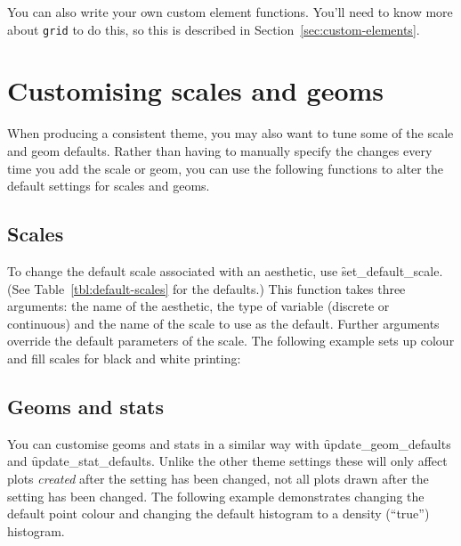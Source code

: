 You can also write your own custom element functions.  You'll need to know more about {\tt grid} to do this, so this is described in Section~\ref{sec:custom-elements}.

\section{Customising scales and geoms}
\label{sec:theme-scale-geom}

When producing a consistent theme, you may also want to tune some of the scale and geom defaults.  Rather than having to manually specify the changes every time you add the scale or geom, you can use the following functions to alter the default settings for scales and geoms.

\subsection{Scales}
\label{sub:customise-scales}

To change the default scale associated with an aesthetic, use \f{set_default_scale}. (See Table~\ref{tbl:default-scales} for the defaults.)  This function takes three arguments: the name of the aesthetic, the type of variable (discrete or continuous) and the name of the scale to use as the default.  Further arguments override the default parameters of the scale.  The following example sets up colour and fill scales for black and white printing:

% 


\subsection{Geoms and stats}
\label{sub:geoms_and_stats}

You can customise geoms and stats in a similar way with \f{update_geom_defaults} and \f{update_stat_defaults}.  Unlike the other theme settings these will only affect plots \emph{created} after the setting has been changed, not all plots drawn after the setting has been changed.  The following example demonstrates changing the default point colour and changing the default histogram to a density (``true'') histogram.  


